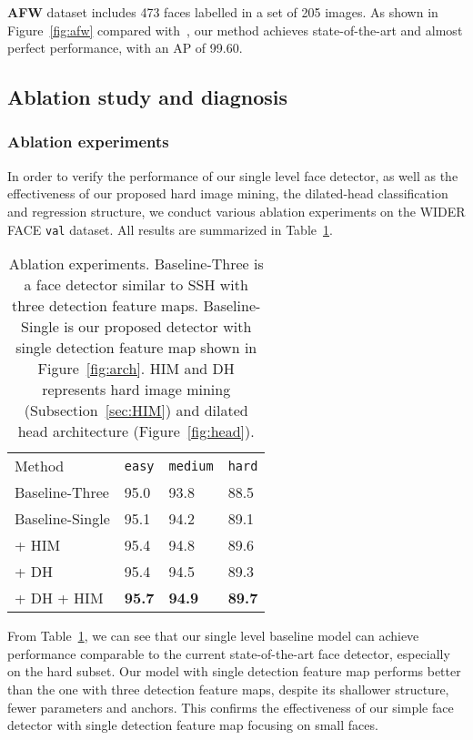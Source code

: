 \documentclass[10pt,twocolumn,letterpaper]{article}
\begin{document}
\vspace{1ex} \noindent \textbf{AFW}
dataset includes 473 faces labelled in a set of 205 images. As shown in Figure~\ref{fig:afw} compared with~\cite{mathias2014face,shen2013detecting,zhang2017s,zhu2012face}, our method achieves
state-of-the-art and almost perfect performance, with an AP of 99.60.
\subsection{Ablation study and diagnosis}
\subsubsection*{Ablation experiments}
In order to verify the performance of our single level face detector,
as well as the effectiveness of our proposed hard image mining, the
dilated-head classification and regression structure, we conduct various ablation experiments on the
WIDER FACE \texttt{val} dataset. All results are summarized in Table~\ref{tbl:ablation}.
\begin{table}[tb]
\centering
\begin{tabular}{|l|l|l|l|}
\hline
Method                       & \texttt{easy}&\texttt{medium} &\texttt{hard} \\ \hhline{|=|=|=|=|}
Baseline-Three          & 95.0 & 93.8  & 88.5 \\ \hhline{|=|=|=|=|}
Baseline-Single         & 95.1 & 94.2  & 89.1 \\ \hline
+ HIM                        & 95.4 & 94.8  & 89.6 \\ \hline
+ DH                         & 95.4 & 94.5  & 89.3 \\ \hline
+ DH + HIM                   & \bf{95.7} & \bf{94.9}  & \bf{89.7} \\ \hline
\end{tabular}
\caption{Ablation experiments. Baseline-Three is a face
detector similar to SSH with three detection feature maps.
Baseline-Single is our proposed detector with single detection feature map
shown in Figure~\ref{fig:arch}. HIM and DH represents hard image mining (Subsection~\ref{sec:HIM}) and dilated head
architecture (Figure~\ref{fig:head}).\label{tbl:ablation}}
\end{table}


From Table~\ref{tbl:ablation}, we can see that our single level baseline model can achieve performance comparable to
the current state-of-the-art face detector, especially on the hard subset.
Our model with single detection feature map performs better than the one with three detection
feature maps, despite its shallower
structure, fewer parameters and anchors.
This confirms the effectiveness
of our simple face detector with single detection feature map focusing on small faces.
\end{document}
